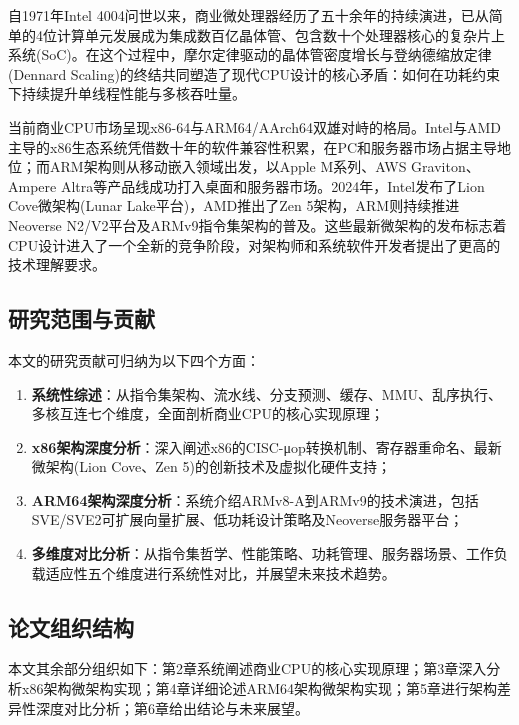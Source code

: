 \documentclass[12pt,a4paper]{IEEEtran}
\begin{document}
自1971年Intel 4004问世以来，商业微处理器经历了五十余年的持续演进，已从简单的4位计算单元发展成为集成数百亿晶体管、包含数十个处理器核心的复杂片上系统(SoC)。在这个过程中，摩尔定律驱动的晶体管密度增长与登纳德缩放定律(Dennard Scaling)的终结共同塑造了现代CPU设计的核心矛盾：如何在功耗约束下持续提升单线程性能与多核吞吐量\cite{hennessy2017computer}。

当前商业CPU市场呈现x86-64与ARM64/AArch64双雄对峙的格局。Intel与AMD主导的x86生态系统凭借数十年的软件兼容性积累，在PC和服务器市场占据主导地位；而ARM架构则从移动嵌入领域出发，以Apple M系列、AWS Graviton、Ampere Altra等产品线成功打入桌面和服务器市场\cite{cutress2022zen4}。2024年，Intel发布了Lion Cove微架构(Lunar Lake平台)，AMD推出了Zen 5架构，ARM则持续推进Neoverse N2/V2平台及ARMv9指令集架构的普及\cite{intel2024lioncove}。这些最新微架构的发布标志着CPU设计进入了一个全新的竞争阶段，对架构师和系统软件开发者提出了更高的技术理解要求。

\subsection{研究范围与贡献}

本文的研究贡献可归纳为以下四个方面：

\begin{enumerate}
\item \textbf{系统性综述}：从指令集架构、流水线、分支预测、缓存、MMU、乱序执行、多核互连七个维度，全面剖析商业CPU的核心实现原理；
\item \textbf{x86架构深度分析}：深入阐述x86的CISC-μop转换机制、寄存器重命名、最新微架构(Lion Cove、Zen 5)的创新技术及虚拟化硬件支持；
\item \textbf{ARM64架构深度分析}：系统介绍ARMv8-A到ARMv9的技术演进，包括SVE/SVE2可扩展向量扩展、低功耗设计策略及Neoverse服务器平台；
\item \textbf{多维度对比分析}：从指令集哲学、性能策略、功耗管理、服务器场景、工作负载适应性五个维度进行系统性对比，并展望未来技术趋势。
\end{enumerate}

\subsection{论文组织结构}

本文其余部分组织如下：第2章系统阐述商业CPU的核心实现原理；第3章深入分析x86架构微架构实现；第4章详细论述ARM64架构微架构实现；第5章进行架构差异性深度对比分析；第6章给出结论与未来展望。

\end{document}
